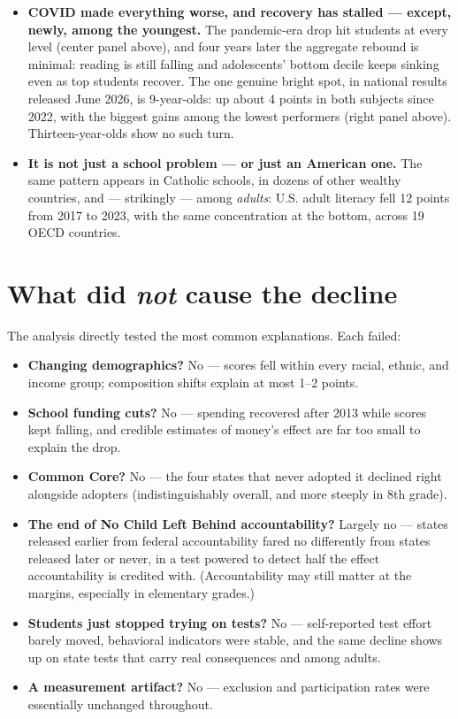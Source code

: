 \documentclass[10pt]{article}
\begin{document}
\begin{itemize}
\item \textbf{COVID made everything worse, and recovery has stalled --- except, newly, among the youngest.} The pandemic-era drop hit students at every level (center panel above), and four years later the aggregate rebound is minimal: reading is still falling and adolescents' bottom decile keeps sinking even as top students recover. The one genuine bright spot, in national results released June 2026, is 9-year-olds: up about 4 points in both subjects since 2022, with the biggest gains among the lowest performers (right panel above). Thirteen-year-olds show no such turn.
\item \textbf{It is not just a school problem --- or just an American one.} The same pattern appears in Catholic schools, in dozens of other wealthy countries, and --- strikingly --- among \emph{adults}: U.S. adult literacy fell 12 points from 2017 to 2023, with the same concentration at the bottom, across 19 OECD countries.
\end{itemize}

\section{What did \emph{not} cause the decline}
The analysis directly tested the most common explanations. Each failed:
\begin{itemize}
\item \textbf{Changing demographics?} No --- scores fell within every racial, ethnic, and income group; composition shifts explain at most 1--2 points.
\item \textbf{School funding cuts?} No --- spending recovered after 2013 while scores kept falling, and credible estimates of money's effect are far too small to explain the drop.
\item \textbf{Common Core?} No --- the four states that never adopted it declined right alongside adopters (indistinguishably overall, and more steeply in 8th grade).
\item \textbf{The end of No Child Left Behind accountability?} Largely no --- states released earlier from federal accountability fared no differently from states released later or never, in a test powered to detect half the effect accountability is credited with. (Accountability may still matter at the margins, especially in elementary grades.)
\item \textbf{Students just stopped trying on tests?} No --- self-reported test effort barely moved, behavioral indicators were stable, and the same decline shows up on state tests that carry real consequences and among adults.
\item \textbf{A measurement artifact?} No --- exclusion and participation rates were essentially unchanged throughout.
\end{itemize}
\end{document}
